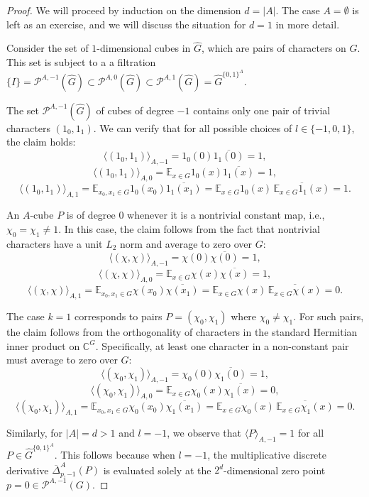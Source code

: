 \documentclass[10pt,a4paper]{amsart}
\begin{document}
\begin{proof}
We will proceed by induction on the dimension  $d = |A|$. The case $A=\emptyset$ is left as an exercise, and we will discuss  the situation for 
 $d=1$ in more detail.  
 
Consider  the set of $1$-dimensional cubes in $\widehat{G}$, which are pairs of characters on $G$. This set is subject to a a filtration $\{I\}=\mathcal{P}^{A,-1}(\widehat{G}) \subset \mathcal{P}^{A,0}(\widehat{G}) \subset \mathcal{P}^{A,1}(\widehat{G}) = \widehat{G}^{\{0,1\}^{A}}$.

The set $\mathcal{P}^{A,-1}(\widehat{G})$ of cubes of degree $-1$ contains only one pair of trivial characters $(1_0,1_1)$. We can verify that for all possible choices of $l \in \{-1,0,1\}$, the claim holds:
$$ \langle \left(1_0,1_1\right) \rangle_{A,-1} = 1_0(0)\overline{1_1(0)} = 1,$$
$$ \langle \left(1_0,1_1\right) \rangle_{A,0} = \mathbb{E}_{x \in G}1_0(x)\overline{1_1(x)} = 1,$$
$$ \langle \left(1_0,1_1\right) \rangle_{A,1} = \mathbb{E}_{x_0,x_1 \in G}1_0(x_0)\overline{1_1(x_1)} = \mathbb{E}_{x \in G}1_0(x) \, \overline{\mathbb{E}_{x \in G}1_1(x)}= 1.$$

An $A$-cube $P$ is of degree 0  whenever it is a nontrivial constant map, i.e., $\chi_0 = \chi_1 \neq 1$. 
In this case, the claim follows from the fact that nontrivial characters have a unit $L_2$ norm and average to zero over $G$:
$$ \langle \left(\chi,\chi\right) \rangle_{A,-1} = \chi(0)\overline{\chi(0)} = 1,$$
$$ \langle \left(\chi, \chi\right) \rangle_{A,0} = \mathbb{E}_{x \in G}\chi(x)\overline{\chi(x)} = 1,$$
$$ \langle \left(\chi,\chi\right) \rangle_{A,1} = \mathbb{E}_{x_0,x_1 \in G}\chi(x_0)\overline{\chi(x_1)} = \mathbb{E}_{x \in G}\chi(x) \, \overline{\mathbb{E}_{x \in G}\chi(x)}= 0.$$

The case $k=1$ corresponds to pairs $P=(\chi_0, \chi_1)$ where $\chi_0 \neq \chi_1$. For such pairs, the claim follows from the orthogonality of characters in the standard Hermitian inner product on $\mathbb{C}^G$. Specifically, at least one character in a non-constant pair must average to zero over $G$:
$$\langle (\chi_0,\chi_1)\rangle_{A,-1} =  \chi_0(0)\overline{\chi_1(0) }= 1, $$
$$\langle (\chi_0,\chi_1)\rangle_{A,0} = \mathbb{E}_{x\in G} \chi_0(x)\overline{\chi_1(x) }= 0, $$
$$ \langle \left(\chi_0,\chi_1\right) \rangle_{A,1} = \mathbb{E}_{x_0,x_1 \in G}\chi_0(x_0)\overline{\chi_1(x_1)} = \mathbb{E}_{x \in G}\chi_0(x) \, \overline{\mathbb{E}_{x \in G}\chi_1(x)}= 0.$$

Similarly, for  $|A|=d>1$ and $l=-1$,  we  observe that $\langle P \rangle_{A,-1} =1$ for all $P \in \widehat{G}^{\{0,1\}^{A}}$. This follows because when $l = -1$, the multiplicative discrete derivative $\overline{\Delta}^A_{p,-1}(P)$ is evaluated solely at the $2^d$-dimensional zero point $p =0 \in \mathcal{P}^{A,-1}( G)$. 


\end{proof}
\end{document}
